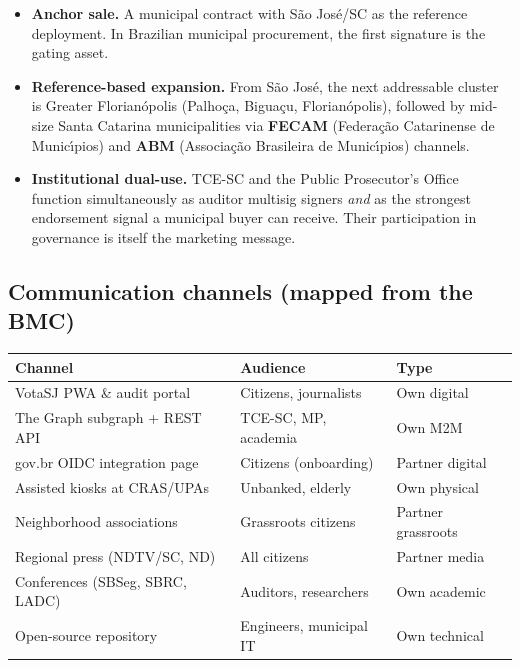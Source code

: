 \documentclass[12pt]{article}
\begin{document}
\begin{itemize}
  \item \textbf{Anchor sale.} A municipal contract with S\~ao Jos\'e/SC
        as the reference deployment. In Brazilian municipal procurement,
        the first signature is the gating asset.
  \item \textbf{Reference-based expansion.} From S\~ao Jos\'e, the next
        addressable cluster is Greater Florian\'opolis (Palho\c{c}a,
        Bigua\c{c}u, Florian\'opolis), followed by mid-size Santa Catarina
        municipalities via \textbf{FECAM} (Federa\c{c}\~ao Catarinense de
        Munic\'{\i}pios) and \textbf{ABM} (Associa\c{c}\~ao Brasileira de
        Munic\'{\i}pios) channels.
  \item \textbf{Institutional dual-use.} TCE-SC and the Public Prosecutor's
        Office function simultaneously as auditor multisig signers \emph{and}
        as the strongest endorsement signal a municipal buyer can receive.
        Their participation in governance is itself the marketing message.
\end{itemize}

\subsection{Communication channels (mapped from the BMC)}

\begin{center}\small
\begin{tabular}{l l l}
\toprule
\textbf{Channel} & \textbf{Audience} & \textbf{Type} \\
\midrule
VotaSJ PWA \& audit portal & Citizens, journalists & Own digital \\
The Graph subgraph + REST API & TCE-SC, MP, academia & Own M2M \\
gov.br OIDC integration page & Citizens (onboarding) & Partner digital \\
Assisted kiosks at CRAS/UPAs & Unbanked, elderly & Own physical \\
Neighborhood associations & Grassroots citizens & Partner grassroots \\
Regional press (NDTV/SC, ND) & All citizens & Partner media \\
Conferences (SBSeg, SBRC, LADC) & Auditors, researchers & Own academic \\
Open-source repository & Engineers, municipal IT & Own technical \\
\bottomrule
\end{tabular}
\end{center}
\end{document}

